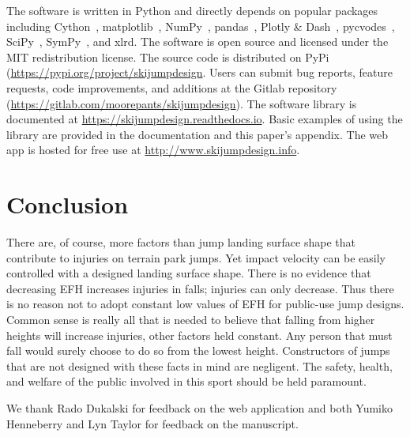 \documentclass[smallextended]{svjour3}       %
\begin{document}
The software is written in Python and directly depends on popular packages
including Cython~\cite{Behnel2011}, matplotlib~\cite{Hunter2007},
NumPy~\cite{Oliphant2006}, pandas~\cite{McKinney2020}, Plotly \&
Dash~\cite{Plotly2015}, pycvodes~\cite{Dahlgren2018},
SciPy~\cite{Virtanen2020}, SymPy~\cite{Meurer2017}, and xlrd. The software is
open source and licensed under the MIT redistribution license. The source code
is distributed on PyPi (\url{https://pypi.org/project/skijumpdesign}. Users can
submit bug reports, feature requests, code improvements, and additions at the
Gitlab repository (\url{https://gitlab.com/moorepants/skijumpdesign}). The
software library is documented at \url{https://skijumpdesign.readthedocs.io}.
Basic examples of using the library are provided in the documentation and this
paper's appendix. The web app is hosted for free use at
\url{http://www.skijumpdesign.info}.

\section{Conclusion}
\label{sec:conc}
%
There are, of course, more factors than jump landing surface shape that
contribute to injuries on terrain park jumps. Yet impact velocity can be easily
controlled with a designed landing surface shape. There is no evidence that
decreasing EFH increases injuries in falls; injuries can only decrease.  Thus
there is no reason not to adopt constant low values of EFH for public-use jump
designs. Common sense is really all that is needed to believe that falling from
higher heights will increase injuries, other factors held constant.  Any person
that must fall would surely choose to do so from the lowest height.
Constructors of jumps that are not designed with these facts in mind are
negligent. The safety, health, and welfare of the public involved in this sport
should be held paramount.

\begin{acknowledgements}
  We thank Rado Dukalski for feedback on the web application and both Yumiko
  Henneberry and Lyn Taylor for feedback on the manuscript.
\end{acknowledgements}
\end{document}
